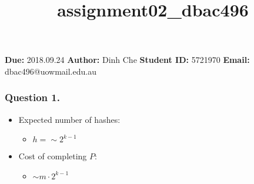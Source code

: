 \documentclass[11pt]{article}
\title{assignment02\_dbac496}
\providecommand{\tightlist}{%
      \setlength{\itemsep}{0pt}\setlength{\parskip}{0pt}}
\begin{document}
    
    
    \maketitle
    
    

    
    \textbf{Due:} 2018.09.24 \textbf{\textbar{} Author:} Dinh Che
\textbf{\textbar{} Student ID:} 5721970 \textbf{\textbar{} Email:}
dbac496@uowmail.edu.au

    \hypertarget{question-1.}{%
\subsubsection{Question 1.}\label{question-1.}}

\begin{itemize}
\tightlist
\item
  Expected number of hashes:

  \begin{itemize}
  \tightlist
  \item
    \(h =\sim 2^{k-1}\)
  \end{itemize}
\item
  Cost of completing \(P\):

  \begin{itemize}
  \tightlist
  \item
    \(\sim m \cdot 2^{k-1}\)
  \end{itemize}
\end{itemize}
\end{document}
